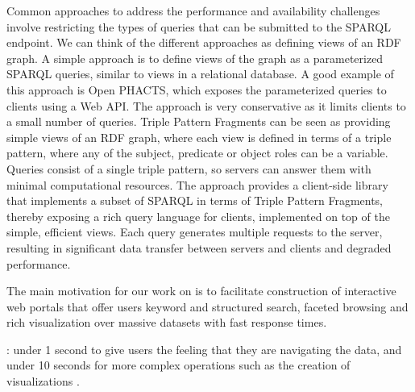 Common approaches to address the performance and availability challenges involve restricting the types of queries that can be submitted to the SPARQL endpoint.
We can think of the different approaches as defining views of an RDF graph.
A simple approach is to define views of the graph as a parameterized SPARQL queries, similar to views in a relational database.
A good example of this approach is Open PHACTS, which exposes the parameterized queries to clients using a Web API.
The approach is very conservative as it limits clients to a small number of queries.
%
Triple Pattern Fragments \cite{Verborgh2014} can be seen as providing simple views of an RDF graph, where each view is defined in terms of a triple pattern, where any of the subject, predicate or object roles can be a variable.
Queries consist of a single triple pattern, so servers can answer them with minimal computational resources.
The approach provides a client-side library that implements a subset of SPARQL in terms of Triple Pattern Fragments, thereby exposing a rich query language for clients, implemented on top of the simple, efficient views.
Each query generates multiple requests to the server, resulting in significant data transfer between servers and clients and degraded performance. 


The main motivation for our work on \ldviews is to facilitate construction of interactive web portals that offer users keyword and structured search, faceted browsing and rich visualization over massive datasets with fast response times.





:  under 1 second to give users the feeling that they are navigating the data, and under 10 seconds for more complex operations such as the creation of visualizations \cite{nielsen1994usability}.